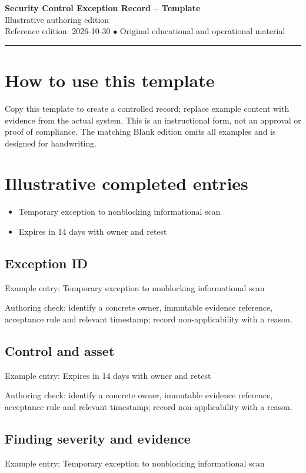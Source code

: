 \documentclass[10pt,letterpaper]{article}
\begin{document}
\begin{center}
{\LARGE\bfseries\color{cdblue}Security Control Exception Record -- Template}\\[7pt]
{\large Illustrative authoring edition}\\[6pt]
{\small Reference edition: 2026-10-30 $\bullet$ Original educational and operational material}
\end{center}
\noindent\color{cdblue}\rule{\linewidth}{1.2pt}\color{black}
\vspace{0.4em}
\section{How to use this template}
Copy this template to create a controlled record; replace example content with evidence from the actual system. This is an instructional form, not an approval or proof of compliance. The matching Blank edition omits all examples and is designed for handwriting.


\section{Illustrative completed entries}
\begin{itemize}
\item Temporary exception to nonblocking informational scan
\item Expires in 14 days with owner and retest
\end{itemize}

\subsection{Exception ID}
Example entry: Temporary exception to nonblocking informational scan

Authoring check: identify a concrete owner, immutable evidence reference, acceptance rule and relevant timestamp; record non-applicability with a reason.


\subsection{Control and asset}
Example entry: Expires in 14 days with owner and retest

Authoring check: identify a concrete owner, immutable evidence reference, acceptance rule and relevant timestamp; record non-applicability with a reason.


\subsection{Finding severity and evidence}
Example entry: Temporary exception to nonblocking informational scan
\end{document}
